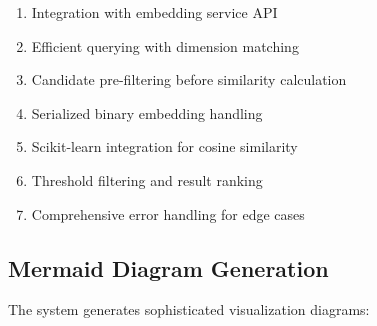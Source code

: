 \documentclass[12pt,a4paper]{article}
\begin{document}
\begin{enumerate}[label=\arabic*.]
    \item Integration with embedding service API
    \item Efficient querying with dimension matching
    \item Candidate pre-filtering before similarity calculation
    \item Serialized binary embedding handling
    \item Scikit-learn integration for cosine similarity
    \item Threshold filtering and result ranking
    \item Comprehensive error handling for edge cases
\end{enumerate}

\subsection*{Mermaid Diagram Generation}

The system generates sophisticated visualization diagrams:
\end{document}
